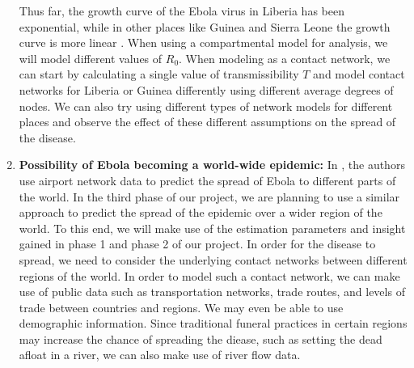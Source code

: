 \documentclass[10pt, journal,onecolumn]{IEEEtran}
\begin{document}
\begin{enumerate}
  Thus far, the growth curve of the Ebola virus in Liberia has been exponential, while in other
  places like Guinea and Sierra Leone the growth curve is more linear \citep{cmriversdata}.
  When using a compartmental model for analysis, we will model different values of
  $R_0$.
  When modeling as a contact network, we can start by calculating a single value of transmissibility
  $T$ and model contact networks for Liberia or Guinea differently using different average degrees of
  nodes.
  We can also try using different types of network models for different places
  and observe the effect of these different assumptions on the spread of the disease. \\

\item \textbf{Possibility of Ebola becoming a world-wide epidemic:} In \citep{gomes2014assessing},
  the authors use airport network data to predict the spread of Ebola to different parts of the
  world. In the third phase of our project, we are planning to use a similar approach to predict the
  spread of the epidemic over a wider region of the world. To this end, we will make use of the estimation
  parameters and insight gained in phase 1 and phase 2 of our project. In order for the disease to
  spread, we need to consider the underlying contact networks between different regions of the
  world. In order to model such a contact network, we can make use of public data such
  as transportation networks, trade routes, and levels of trade between countries and regions.
  We may even be able to use demographic information.
  Since traditional funeral practices in certain regions may increase
  the chance of spreading the diease, such as setting the dead afloat in a river, we can also make
  use of river flow data.

\end{enumerate}



%






\end{document}
